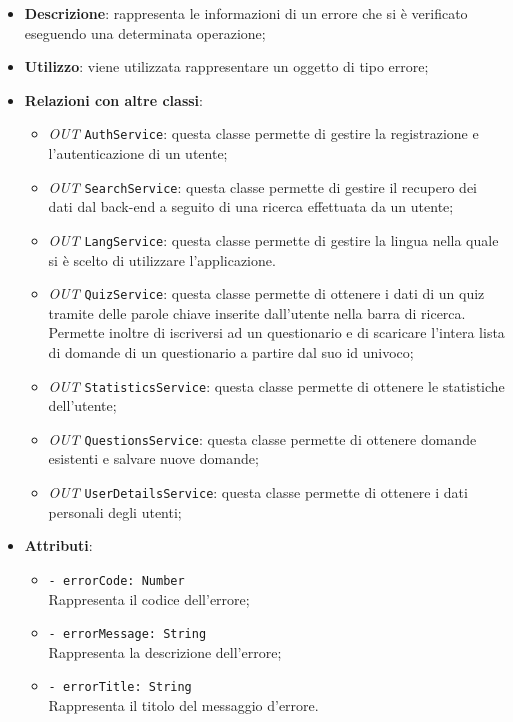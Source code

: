 		\begin{itemize}
			\item \textbf{Descrizione}: rappresenta le informazioni di un errore che si è verificato eseguendo una determinata operazione;
			\item \textbf{Utilizzo}: viene utilizzata rappresentare un oggetto di tipo errore;
			\item \textbf{Relazioni con altre classi}: 
			\begin{itemize}
			 	\item \textit{OUT} \texttt{AuthService}: questa classe permette di gestire la registrazione e l'autenticazione di un utente;
			 	\item \textit{OUT} \texttt{SearchService}: questa classe permette di gestire il recupero dei dati dal back-end a seguito di una ricerca effettuata da un utente;
			 	\item \textit{OUT} \texttt{LangService}: questa classe permette di gestire la lingua nella quale si è scelto di utilizzare l'applicazione.
			 	\item \textit{OUT} \texttt{QuizService}: questa classe permette di ottenere i dati di un quiz tramite delle parole chiave inserite dall'utente nella barra di ricerca. Permette inoltre di iscriversi ad un questionario e di scaricare l'intera lista di domande di un questionario a partire dal suo id univoco;
			 	\item \textit{OUT} \texttt{StatisticsService}: questa classe permette di ottenere le statistiche dell'utente;
		 		\item \textit{OUT} \texttt{QuestionsService}: questa classe permette di ottenere domande esistenti e salvare nuove domande;
	 			\item \textit{OUT} \texttt{UserDetailsService}: questa classe permette di ottenere i dati personali degli utenti;
			\end{itemize}
			\item \textbf{Attributi}: 
			\begin{itemize}
				\item \texttt{- errorCode: Number} \\ 
				Rappresenta il codice dell'errore;
				\item \texttt{- errorMessage: String} \\ 
				Rappresenta la descrizione dell'errore; 
				\item \texttt{- errorTitle: String}\\ 
				Rappresenta il titolo del messaggio d'errore.
			\end{itemize}

\end{itemize}
